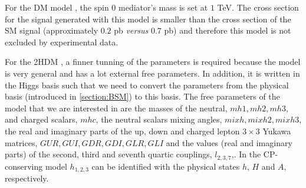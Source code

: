 
For the DM model \cite{DM}, the spin 0 mediator's mass is set at $1$ TeV. The cross section for the signal generated with this model is smaller than the cross section of the SM signal (approximately $0.2$ pb \textit{versus} $0.7$ pb) and therefore this model is not excluded by experimental data.

For the 2HDM \cite{2HDM,2HDM1}, a finner tunning of the parameters is required because the model is very general and has a lot external free parameters. In addition, it is written in the Higgs basis such that we need to convert the parameters from the physical basis (introduced in \ref{section:BSM}) to this basis. The free parameters of the model that we are interested in are the masses of the neutral, $mh1, mh2, mh3$, and charged scalars, $mhc$, the neutral scalars mixing angles, $mixh, mixh2, mixh3$, the real and imaginary parts of the up, down and charged lepton $3\times 3$ Yukawa matrices, $GUR, GUI, GDR, GDI, GLR, GLI$ and the values (real and imaginary parts) of the second, third and seventh quartic couplings, $l_{2,3,7}$,. In the CP-conserving model $h_{1,2,3}$ can be identified with the physical states $h$, $H$ and $A$, respectively.

